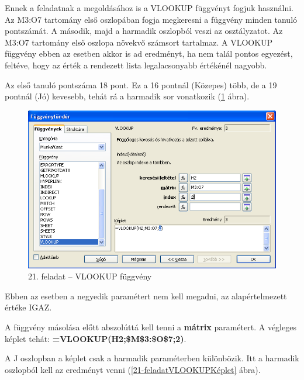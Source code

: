 Ennek a feladatnak a megoldásához is a VLOOKUP függvényt fogjuk
használni. Az M3:O7 tartomány első oszlopában fogja
megkeresni a függvény minden tanuló pontszámát. A második,
majd a harmadik oszlopból veszi az osztályzatot. Az M3:O7
tartomány első oszlopa növekvő számsort tartalmaz. A
VLOOKUP függvény ebben az esetben akkor is ad eredményt, ha nem
talál pontos egyezést, feltéve, hogy az érték a rendezett
lista legalacsonyabb értékénél nagyobb.

Az első tanuló pontszáma 18 pont. Ez a 16 pontnál (Közepes)
több, de a 19 pontnál (Jó) kevesebb, tehát rá a harmadik sor
vonatkozik (\ref{21-feladatVLOOKUP} ábra).

\begin{figure}[!h]
\begin{center}
\includegraphics[width=13.999cm]{oocalcv1-img98.png}
\caption{21. feladat --  VLOOKUP függvény}\label{21-feladatVLOOKUP}
\end{center}
\end{figure}

Ebben az esetben a negyedik paramétert nem kell megadni, az
alapértelmezett értéke IGAZ.

A függvény másolása előtt abszolúttá kell tenni a
\textbf{mátrix} paramétert. A végleges képlet tehát:
\textsf{\textbf{=VLOOKUP(H2;\$M\$3:\$O\$7;2)}}.

A J oszlopban a képlet csak a harmadik paraméterben
különbözik. Itt a harmadik oszlopból kell az eredményt venni
(\ref{21-feladatVLOOKUPKéplet} ábra).

